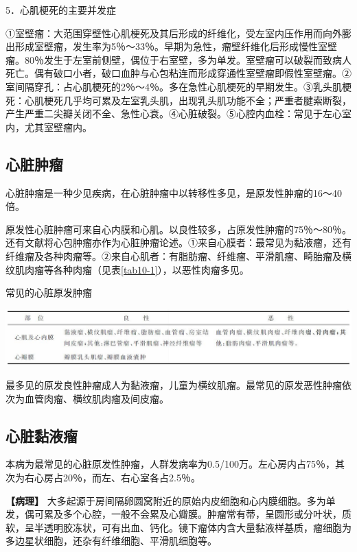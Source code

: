 5．心肌梗死的主要并发症

①室壁瘤：大范围穿壁性心肌梗死及其后形成的纤维化，受左室内压作用而向外膨出形成室壁瘤，发生率为5％～33％。早期为急性，瘤壁纤维化后形成慢性室壁瘤。80％发生于左室前侧壁，偶位于右室壁，多为单发。室壁瘤可以破裂而致病人死亡。偶有破口小者，破口血肿与心包粘连而形成穿通性室壁瘤即假性室壁瘤。②室间隔穿孔：占心肌梗死的2％～4％。多在急性心肌梗死的早期发生。③乳头肌梗死：心肌梗死几乎均可累及左室乳头肌，出现乳头肌功能不全；严重者腱索断裂，产生严重二尖瓣关闭不全、急性心衰。④心脏破裂。⑤心腔内血栓：常见于左心室内，尤其室壁瘤内。

\subsection{心脏肿瘤}

心脏肿瘤是一种少见疾病，在心脏肿瘤中以转移性多见，是原发性肿瘤的16～40倍。

原发性心脏肿瘤可来自心内膜和心肌。以良性较多，占原发性肿瘤的75％～80％。还有文献将心包肿瘤亦作为心脏肿瘤论述。①来自心膜者：最常见为黏液瘤，还有纤维瘤及各种肉瘤等。②来自心肌者：有脂肪瘤、纤维瘤、平滑肌瘤、畸胎瘤及横纹肌肉瘤等各种肉瘤（见表\ref{tab10-1}），以恶性肉瘤多见。

\begin{table}[htbp]
\centering
\caption{常见的心脏原发肿瘤}
\label{tab10-1}
\includegraphics[width=\textwidth,height=\textheight,keepaspectratio]{./images/Image00267.jpg}
\end{table}

最多见的原发良性肿瘤成人为黏液瘤，儿童为横纹肌瘤。最常见的原发恶性肿瘤依次为血管肉瘤、横纹肌肉瘤及间皮瘤。

\subsection{心脏黏液瘤}

本病为最常见的心脏原发性肿瘤，人群发病率为0.5/100万。左心房内占75％，其次为右心房占20％，而左、右心室各占2.5％。

\textbf{【病理】}
大多起源于房间隔卵圆窝附近的原始内皮细胞和心内膜细胞。多为单发，偶可累及多个心腔，一般不会累及心瓣膜。肿瘤常有蒂，呈圆形或分叶状，质软，呈半透明胶冻状，可有出血、钙化。镜下瘤体内含大量黏液样基质，瘤细胞为多边星状细胞，还杂有纤维细胞、平滑肌细胞等。

